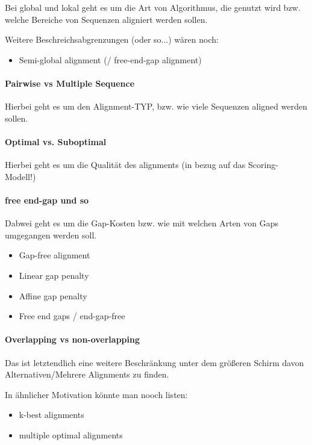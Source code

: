 


Bei global und lokal geht es um die Art von Algorithmus, die genutzt wird bzw. welche Bereiche von Sequenzen
aligniert werden sollen. \cite{tamang}

Weitere Beschreichsabgrenzungen (oder so...) wären noch:
\begin{itemize}
    \item Semi-global alignment (/ free-end-gap alignment)
\end{itemize}

\paragraph{Pairwise vs Multiple Sequence}
Hierbei geht es um den Alignment-TYP, bzw. wie viele Sequenzen aligned werden sollen. \cite{tamang}

\paragraph{Optimal vs. Suboptimal}
Hierbei geht es um die Qualität des alignments (in bezug auf das Scoring-Modell!)

\paragraph{free end-gap und so} Dabwei geht es um die Gap-Kosten bzw. wie mit welchen Arten von Gaps umgegangen
werden soll.
\begin{itemize}
    \item Gap-free alignment
    \item Linear gap penalty
    \item Affine gap penalty
    \item Free end gaps / end-gap-free
\end{itemize}

\paragraph{Overlapping vs non-overlapping}
Das ist letztendlich eine weitere Beschränkung unter dem größeren Schirm davon Alternativen/Mehrere Alignments zu
finden.

In ähnlicher Motivation könnte man nooch listen:
\begin{itemize}
    \item k-best alignments
    \item multiple optimal alignments
\end{itemize}



